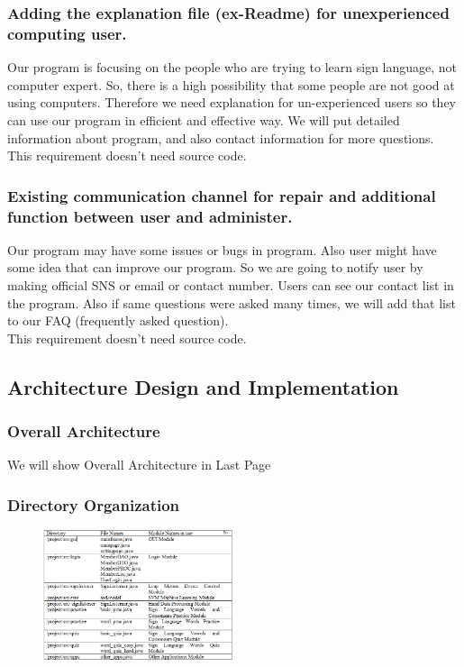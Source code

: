 \documentclass[10pt,journal,compsoc]{IEEEtran}
\begin{document}
\subsubsection{Adding the explanation file (ex-Readme) for unexperienced computing user.\\}

Our program is focusing on the people who are trying to learn sign language, not computer expert. So, there is a high possibility that some people are not good at using computers. Therefore we need explanation for un-experienced users so they can use our program in efficient and effective way. We will put detailed information about program, and also contact information for more questions.
\\This requirement doesn’t need source code.
\subsubsection{Existing communication channel for repair and additional function between user and administer.\\}
Our program may have some issues or bugs in program. Also user might have some idea that can improve our program. So we are going to notify user by making official SNS or email or contact number. Users can see our contact list in the program. Also if same questions were asked many times, we will add that list to our FAQ (frequently asked question).
\\This requirement doesn’t need source code.

\subsection{Architecture Design and Implementation\\}
\subsubsection{Overall Architecture\\}
We will show Overall Architecture in Last Page
\subsubsection{Directory Organization}
\begin{figure}[H]
\centering
\includegraphics[width=0.5\textwidth]{capture.png}
\caption{}
\end{figure}
\end{document}
